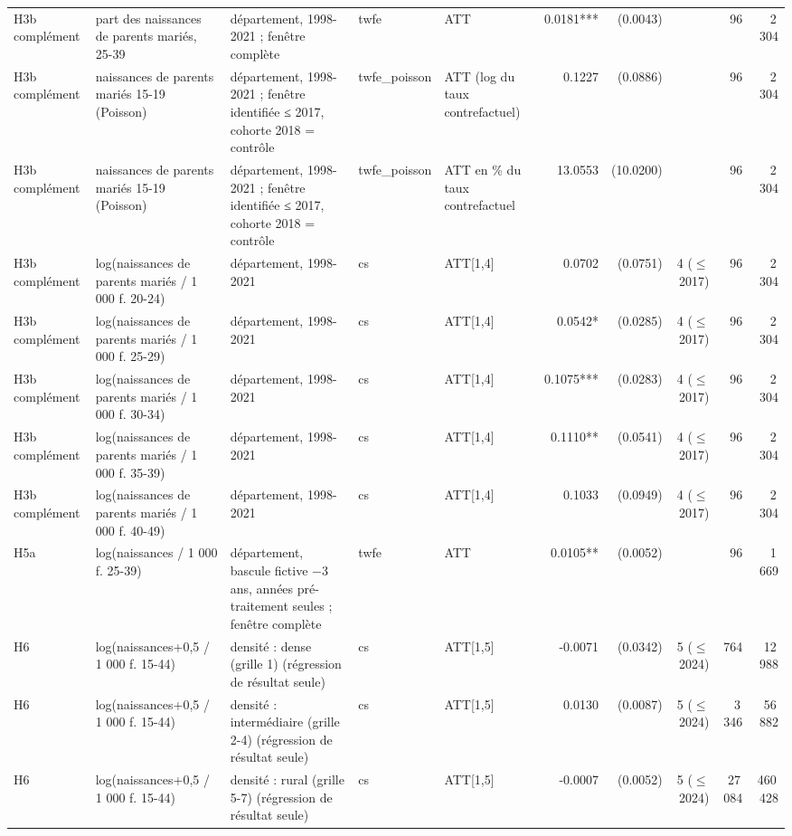 \begin{table}
\begin{threeparttable}
\begin{tabular}{lp{3.8cm}p{4.6cm}lp{3.5cm}rrrrr}
H3b complément & part des naissances de parents mariés, 25-39 & département, 1998-2021 ; fenêtre complète & twfe & ATT & 0.0181*** & (0.0043) &  & 96 & 2\,304 \\
H3b complément & naissances de parents mariés 15-19 (Poisson) & département, 1998-2021 ; fenêtre identifiée ≤ 2017, cohorte 2018 = contrôle & twfe\_poisson & ATT (log du taux contrefactuel) & 0.1227 & (0.0886) &  & 96 & 2\,304 \\
H3b complément & naissances de parents mariés 15-19 (Poisson) & département, 1998-2021 ; fenêtre identifiée ≤ 2017, cohorte 2018 = contrôle & twfe\_poisson & ATT en \% du taux contrefactuel & 13.0553 & (10.0200) &  & 96 & 2\,304 \\
H3b complément & log(naissances de parents mariés / 1 000 f. 20-24) & département, 1998-2021 & cs & ATT[1,4] & 0.0702 & (0.0751) & 4 ($\leq$ 2017) & 96 & 2\,304 \\
H3b complément & log(naissances de parents mariés / 1 000 f. 25-29) & département, 1998-2021 & cs & ATT[1,4] & 0.0542* & (0.0285) & 4 ($\leq$ 2017) & 96 & 2\,304 \\
H3b complément & log(naissances de parents mariés / 1 000 f. 30-34) & département, 1998-2021 & cs & ATT[1,4] & 0.1075*** & (0.0283) & 4 ($\leq$ 2017) & 96 & 2\,304 \\
H3b complément & log(naissances de parents mariés / 1 000 f. 35-39) & département, 1998-2021 & cs & ATT[1,4] & 0.1110** & (0.0541) & 4 ($\leq$ 2017) & 96 & 2\,304 \\
H3b complément & log(naissances de parents mariés / 1 000 f. 40-49) & département, 1998-2021 & cs & ATT[1,4] & 0.1033 & (0.0949) & 4 ($\leq$ 2017) & 96 & 2\,304 \\
H5a & log(naissances / 1 000 f. 25-39) & département, bascule fictive $-$3 ans, années pré-traitement seules ; fenêtre complète & twfe & ATT & 0.0105** & (0.0052) &  & 96 & 1\,669 \\
H6 & log(naissances+0,5 / 1 000 f. 15-44) & densité : dense (grille 1) (régression de résultat seule) & cs & ATT[1,5] & -0.0071 & (0.0342) & 5 ($\leq$ 2024) & 764 & 12\,988 \\
H6 & log(naissances+0,5 / 1 000 f. 15-44) & densité : intermédiaire (grille 2-4) (régression de résultat seule) & cs & ATT[1,5] & 0.0130 & (0.0087) & 5 ($\leq$ 2024) & 3\,346 & 56\,882 \\
H6 & log(naissances+0,5 / 1 000 f. 15-44) & densité : rural (grille 5-7) (régression de résultat seule) & cs & ATT[1,5] & -0.0007 & (0.0052) & 5 ($\leq$ 2024) & 27\,084 & 460\,428 \\

\end{tabular}
\end{threeparttable}
\end{table}

